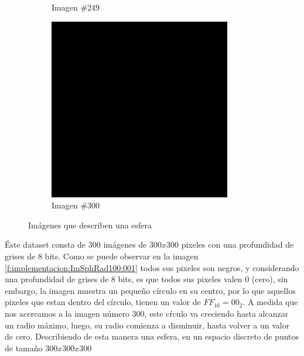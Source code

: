 \begin{figure}
\begin{subfigure}{0.30\textwidth}
		\caption{Imagen \#249}
		\label{f:implementacion:ImSphRad100:249}
	\end{subfigure}
	\begin{subfigure}{0.30\textwidth}
		\centering
		\includegraphics[width=\textwidth]{images/datasets/ImSphRad100/Sphere300.png}
		\caption{Imagen \#300}
		\label{f:implementacion:ImSphRad100:300}
	\end{subfigure}

	\caption{Imágenes que describen una esfera}
	\label{f:implementacion:dataset:ImSphRad100}
\end{figure}

Éste dataset consta de 300 imágenes de $300 x 300$ pixeles con una profundidad de grises de 8 bits. Como se puede observar en la imagen \ref{f:implementacion:ImSphRad100:001} todos sus pixeles son negros, y considerando una profundidad de grises de 8 bits, es que todos sus pixeles valen $0$ (cero), sin embargo, la imagen \label{f:implementacion:ImSphRad100:051} muestra un pequeño círculo en su centro, por lo que aquellos pixeles que estan dentro del círculo, tienen un valor de $FF_{16} = 00_{2}$. A medida que nos acercamos a la imagen número 300, este cŕculo va creciendo hasta alcanzar un radio máximo, luego, su radio comienza a disminuir, hasta volver a un valor de cero. Describiendo de esta manera una esfera, en un espacio discreto de puntos de tamaño $300 x 300 x 300$

